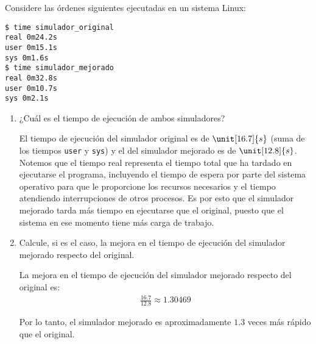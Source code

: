 \begin{ejercicio}
    Considere las órdenes siguientes ejecutadas en un sistema Linux:
    \begin{verbatim}
$ time simulador_original
real 0m24.2s
user 0m15.1s
sys 0m1.6s
$ time simulador_mejorado
real 0m32.8s
user 0m10.7s
sys 0m2.1s
    \end{verbatim}

    \begin{enumerate}
        \item ¿Cuál es el tiempo de ejecución de ambos simuladores?
        
        El tiempo de ejecución del simulador original es de $\unit[16.7]{s}$ (suma de los tiempos \verb|user| y \verb|sys|) y el del simulador mejorado es de $\unit[12.8]{s}$. Notemos que el tiempo real representa el tiempo total que ha tardado en ejecutarse el programa, incluyendo el tiempo de espera por parte del sistema operativo para que le proporcione los recursos necesarios y el tiempo atendiendo interrupciones de otros procesos. Es por esto que el simulador mejorado tarda más tiempo en ejecutarse que el original, puesto que el sistema en ese momento tiene más carga de trabajo.
        \item Calcule, si es el caso, la mejora en el tiempo de ejecución del simulador mejorado respecto del original.
        
        La mejora en el tiempo de ejecución del simulador mejorado respecto del original es:
        \begin{align*}
            \frac{16.7}{12.8} \approx 1.30469
        \end{align*}

        Por lo tanto, el simulador mejorado es aproximadamente $1.3$ veces más rápido que el original.
    \end{enumerate}
\end{ejercicio}
\begin{comment}
    Solución: El simulador original se ejecuta en 16,7 segundos y el mejorado en 12,8 segundos (en realidad, los datos muestran que al sistema le cuesta más tiempo porque ha de atender otras tareas). El simulador mejorado es 1,3 veces más rápido que el original.
\end{comment}

